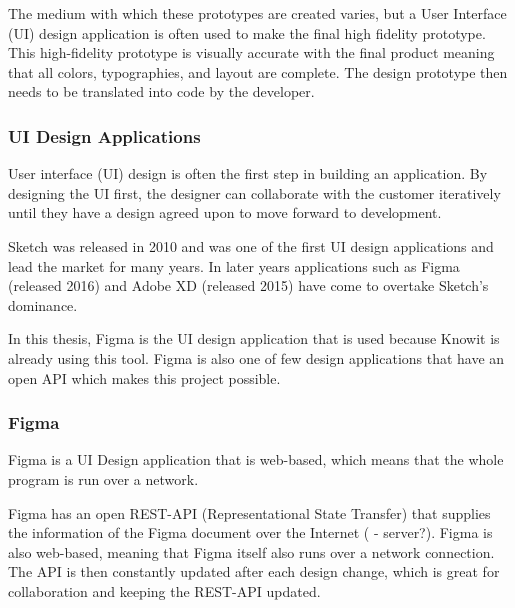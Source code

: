 The medium with which these prototypes are created varies, but a User Interface (UI) design application is often used to make the final high fidelity prototype. This high-fidelity prototype is visually accurate with the final product meaning that all colors, typographies, and layout are complete. The design prototype then needs to be translated into code by the developer. 

\subsubsection{UI Design Applications}%
\label{ssub:Apps}
User interface (UI) design is often the first step in building an application. By designing the UI first, the designer can collaborate with the customer iteratively until they have a design agreed upon to move forward to development.

Sketch\cite{sketchDigitalDesignToolkit} was released in 2010 and was one of the first UI design applications and lead the market for many years. In later years applications such as Figma\cite{figmaFigmaCollaborativeInterface}  (released 2016) and Adobe XD\cite{adobeAdobeXDFast} (released 2015) have come to overtake Sketch's dominance. 

In this thesis, Figma is the UI design application that is used because Knowit is already using this tool. Figma is also one of few design applications that have an open API which makes this project possible. 

 






\subsubsection{Figma}%
\label{sub:Figma}
Figma is a UI Design application that is web-based, which means that the whole program is run over a network. 

Figma has an open REST-API (Representational State Transfer) that supplies the information of the Figma document over the Internet\cite{figmaFigma, RepresentationalStateTransfer2021} ( \textit{} - server?). Figma is also web-based, meaning that Figma itself also runs over a network connection. The API is then constantly updated after each design change, which is great for collaboration and keeping the REST-API updated.

